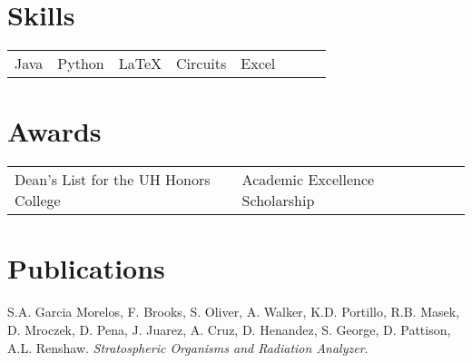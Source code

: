 \documentclass{cv_class}
\begin{document}
    
    
\section{Skills}
\begin{tabular}{l l l l l l l l}
  Java & Python & \LaTeX & Circuits & Excel
\end{tabular}

\section{Awards}
\begin{tabular}{l l l l}
  Dean's List for the UH Honors College & Academic Excellence Scholarship
\end{tabular}

\section{Publications}
\begin{enumerate}[\hspace{1cm}{[1]}]
\item{S.A. Garcia Morelos, F. Brooks, S. Oliver, A. Walker, K.D. Portillo, R.B. Masek, D. Mroczek, D. Pena, J. Juarez,
A. Cruz, D. Henandez, S. George, D. Pattison, A.L. Renshaw. \textit{Stratospheric Organisms and Radiation Analyzer}.}
\end{enumerate}
\end{document}
